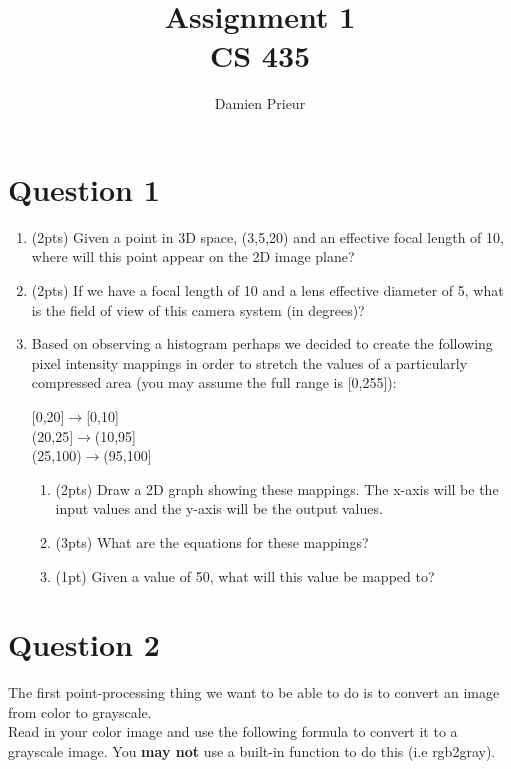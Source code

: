 \documentclass{article}
\author{Damien Prieur}
\title{Assignment 1 \\ CS 435}
\date{}
\begin{document}
\maketitle

\section*{Question 1}
\begin{enumerate}
\item (2pts) Given a point in 3D space, (3,5,20) and an effective focal length of 10, where will this point appear on the 2D image plane?

\item (2pts) If we have a focal length of 10 and a lens effective diameter of 5, what is the field of view of this camera system (in degrees)?

\item   Based on observing a histogram perhaps we decided to create the following pixel intensity mappings in order to stretch the values of a particularly compressed area (you may assume the full range is [0,255]):\\

\begin{center}
[0,20]$\rightarrow$[0,10]\\
(20,25]$\rightarrow$(10,95]\\
(25,100)$\rightarrow$(95,100]
\end{center}

\begin{enumerate}
\item(2pts) Draw a 2D graph showing these mappings.  The x-axis will be the input values and the y-axis will be the output values.

\item (3pts) What are the equations for these mappings?

\item (1pt) Given a value of 50, what will this value be mapped to?
\end{enumerate}
\end{enumerate}

\section*{Question 2}
The first point-processing thing we want to be able to do is to convert an image from color to grayscale.\\

\noindent
Read in your color image and use the following formula to convert it to a grayscale image.  You \textbf{may not} use a built-in function to do this (i.e rgb2gray).\\
\end{document}
